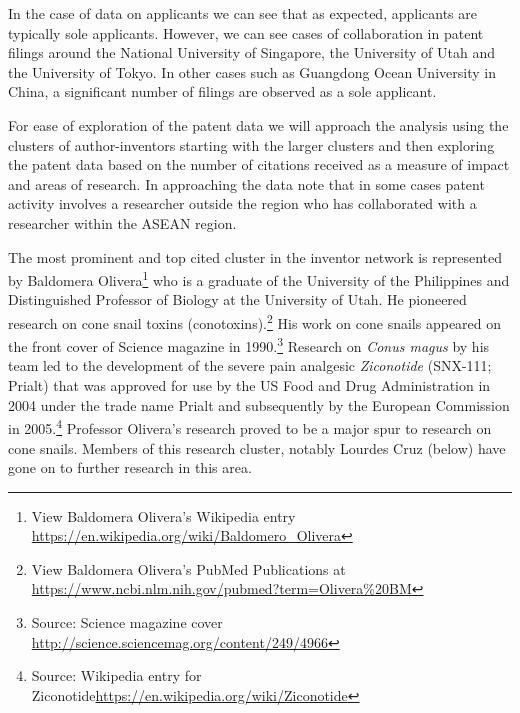 \documentclass[]{book}
\let\rmarkdownfootnote\footnote%
\def\footnote{\protect\rmarkdownfootnote}
\theoremstyle{definition}
\theoremstyle{definition}
\theoremstyle{definition}
\theoremstyle{remark}
\begin{document}
In the case of data on applicants we can see that as expected,
applicants are typically sole applicants. However, we can see cases of
collaboration in patent filings around the National University of
Singapore, the University of Utah and the University of Tokyo. In other
cases such as Guangdong Ocean University in China, a significant number
of filings are observed as a sole applicant.

For ease of exploration of the patent data we will approach the analysis
using the clusters of author-inventors starting with the larger clusters
and then exploring the patent data based on the number of citations
received as a measure of impact and areas of research. In approaching
the data note that in some cases patent activity involves a researcher
outside the region who has collaborated with a researcher within the
ASEAN region.

The most prominent and top cited cluster in the inventor network is
represented by Baldomera Olivera\footnote{View Baldomera Olivera's
  Wikipedia entry \url{https://en.wikipedia.org/wiki/Baldomero_Olivera}}
who is a graduate of the University of the Philippines and Distinguished
Professor of Biology at the University of Utah. He pioneered research on
cone snail toxins (conotoxins).\footnote{View Baldomera Olivera's PubMed
  Publications at
  \url{https://www.ncbi.nlm.nih.gov/pubmed?term=Olivera\%20BM}} His work
on cone snails appeared on the front cover of Science magazine in
1990.\footnote{Source: Science magazine cover
  \url{http://science.sciencemag.org/content/249/4966}} Research on
\emph{Conus magus} by his team led to the development of the severe pain
analgesic \emph{Ziconotide} (SNX-111; Prialt) that was approved for use
by the US Food and Drug Administration in 2004 under the trade name
Prialt and subsequently by the European Commission in 2005.\footnote{Source:
  Wikipedia entry for
  Ziconotide\url{https://en.wikipedia.org/wiki/Ziconotide}} Professor
Olivera's research proved to be a major spur to research on cone snails.
Members of this research cluster, notably Lourdes Cruz (below) have gone
on to further research in this area.
\end{document}
